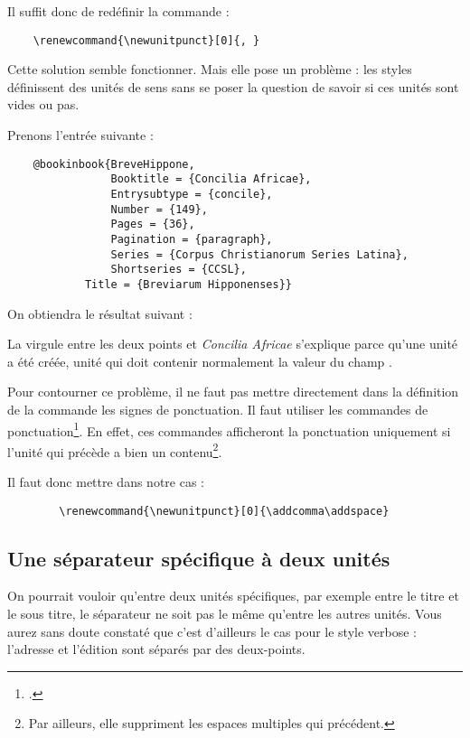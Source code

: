 	Il suffit donc de redéfinir la commande :
	
	\begin{verbatim}
	\renewcommand{\newunitpunct}[0]{, }
	\end{verbatim}
	
	Cette solution semble fonctionner. Mais elle pose un problème : les styles définissent des unités de sens sans se poser la question de savoir si ces unités sont vides ou pas.
	
	Prenons l'entrée suivante :
	
		
	\begin{verbatim}
	@bookinbook{BreveHippone,
        		Booktitle = {Concilia Africae},
        		Entrysubtype = {concile},
        		Number = {149},
        		Pages = {36},
        		Pagination = {paragraph},
        		Series = {Corpus Christianorum Series Latina},
        		Shortseries = {CCSL},
       		Title = {Breviarum Hipponenses}}	
	\end{verbatim}
	
	On obtiendra le résultat suivant :
	
	\begin{quotation}
		\cite{BreveHippone}
	\end{quotation}
	
	La virgule entre les deux points et \emph{Concilia Africae} s'explique parce qu'une unité a été créée, unité qui doit contenir normalement la valeur du champ .
	
	Pour contourner ce problème, il ne faut pas mettre directement dans la définition de la commande  les signes de ponctuation. Il faut utiliser les commandes de ponctuation\footcite[Listées dans]{biblatexponctuation}. En effet, ces commandes afficheront la ponctuation uniquement si l'unité qui précède a bien un contenu\footnote{Par ailleurs, elle suppriment les espaces multiples qui précédent.}.
	
	Il faut donc mettre dans notre cas :
	
	\begin{verbatim}
		\renewcommand{\newunitpunct}[0]{\addcomma\addspace}
	\end{verbatim}
	
	
	\subsection{Une séparateur spécifique à deux unités}
	
	On pourrait vouloir qu'entre deux unités spécifiques, par exemple entre le titre et le sous titre, le séparateur ne soit pas le même qu'entre les autres unités.	Vous aurez sans doute constaté que c'est d'ailleurs le cas pour le style verbose : l'adresse et l'édition sont séparés par des deux-points.
	
